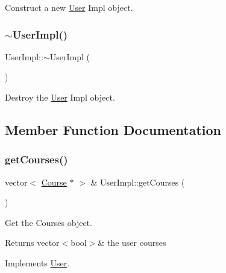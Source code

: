 Construct a new \hyperlink{classUser}{User} Impl object. 

\mbox{\label{classUserImpl_ad138e8fe61218dbbe61a13ce9b17decc}} 
\subsubsection{\texorpdfstring{$\sim$\+User\+Impl()}{~UserImpl()}}
{\footnotesize\ttfamily User\+Impl\+::$\sim$\+User\+Impl (\begin{DoxyParamCaption}{ }\end{DoxyParamCaption})}



Destroy the \hyperlink{classUser}{User} Impl object. 



\subsection{Member Function Documentation}
\mbox{\label{classUserImpl_aaac79e7ca4bf050cf0c180fb5ec2d751}} 
\subsubsection{\texorpdfstring{get\+Courses()}{getCourses()}}
{\footnotesize\ttfamily vector$<$ \hyperlink{classCourse}{Course} $\ast$ $>$ \& User\+Impl\+::get\+Courses (\begin{DoxyParamCaption}{ }\end{DoxyParamCaption})\hspace{0.3cm}{\ttfamily [virtual]}}



Get the Courses object. 

\begin{DoxyReturn}{Returns}
vector$<$bool$>$\& the user courses 
\end{DoxyReturn}


Implements \hyperlink{classUser_a72be855a1f58cc705591413a72a8e346}{User}.

\mbox{\label{classUserImpl_aa20a69738aa1b1ee2e04a6aa65833440}} 
